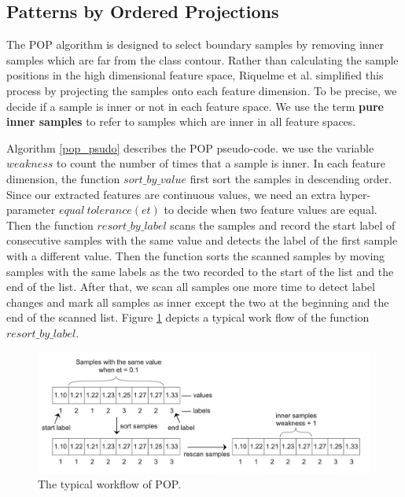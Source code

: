 \subsection{Patterns by Ordered Projections}

The POP algorithm \cite{Riquelme2003a} is designed to select boundary samples by removing inner samples which are far from the class contour. Rather than calculating the sample positions in the high dimensional feature space, Riquelme et al. simplified this process by projecting the samples onto each feature dimension. To be precise, we decide if a sample is inner or not in each feature space. We use the term \textbf{pure inner samples} to refer to samples which are inner in all feature spaces. 

Algorithm \ref{pop_psudo} describes the POP pseudo-code. we use the variable $weakness$ to count the number of times that a sample is inner. In each feature dimension, the function $sort\_by\_value$ first sort the samples in descending order. Since our extracted features are continuous values, we need an extra hyper-parameter $equal\ tolerance (et)$ to decide when two feature values are equal. Then the function $resort\_by\_label$ scans the samples and record the start label of consecutive samples with the same value and detects the label of the first sample with a different value. Then the function sorts the scanned samples by moving samples with the same labels as the two recorded to the start of the list and the end of the list. After that, we scan all samples one more time to detect label changes and mark all samples as inner except the two at the beginning and the end of the scanned list. Figure \ref{Fig.pop_work_flow} depicts a typical work flow of the function $resort\_by\_label$.


 \begin{figure}[H]
 \centering
 \includegraphics[width=1\textwidth]{src/pop_work_flow.png}
 \caption{The typical workflow of POP.}
 \label{Fig.pop_work_flow}
 \end{figure}


